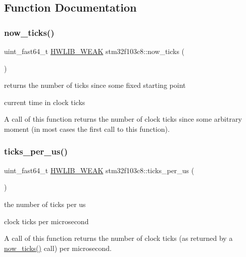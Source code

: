 \subsection{Function Documentation}
\mbox{\label{namespacestm32f103c8_a3cee8ad2019972eede2f90456d5eb9e0}} 
\subsubsection{\texorpdfstring{now\+\_\+ticks()}{now\_ticks()}}
{\footnotesize\ttfamily uint\+\_\+fast64\+\_\+t \hyperlink{hwlib-defines_8hpp_a04be4340016df60d6636c1d1c6d94fc9}{H\+W\+L\+I\+B\+\_\+\+W\+E\+AK} stm32f103c8\+::now\+\_\+ticks (\begin{DoxyParamCaption}{ }\end{DoxyParamCaption})}



returns the number of ticks since some fixed starting point 

current time in clock ticks

A call of this function returns the number of clock ticks since some arbitrary moment (in most cases the first call to this function). \mbox{\label{namespacestm32f103c8_a7690d875e87715532777680634201060}} 
\subsubsection{\texorpdfstring{ticks\+\_\+per\+\_\+us()}{ticks\_per\_us()}}
{\footnotesize\ttfamily uint\+\_\+fast64\+\_\+t \hyperlink{hwlib-defines_8hpp_a04be4340016df60d6636c1d1c6d94fc9}{H\+W\+L\+I\+B\+\_\+\+W\+E\+AK} stm32f103c8\+::ticks\+\_\+per\+\_\+us (\begin{DoxyParamCaption}{ }\end{DoxyParamCaption})}



the number of ticks per us 

clock ticks per microsecond

A call of this function returns the number of clock ticks (as returned by a \hyperlink{namespacestm32f103c8_a3cee8ad2019972eede2f90456d5eb9e0}{now\+\_\+ticks()} call) per microsecond. \mbox{\label{namespacestm32f103c8_ab6a4d37dccd20d9ddd6ef943fffeb114}} 
